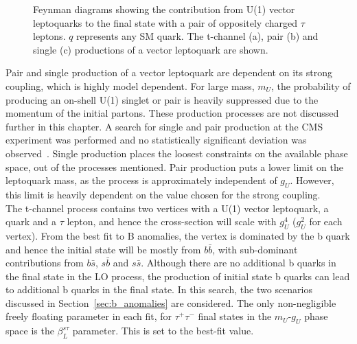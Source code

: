 \begin{figure}[t]
\begin{subfigure}[b]{0.3\textwidth}
\caption{}
\end{subfigure}
\vspace*{10mm}
\caption{Feynman diagrams showing the contribution from U(1) vector leptoquarks to the final state with a pair of oppositely charged $\tau$ leptons. $q$ represents any SM quark. The t-channel (a), pair (b) and single (c) productions of a vector leptoquark are shown.}
\label{fig:leptoquark_feynman}
\end{figure}

Pair and single production of a vector leptoquark are dependent on its strong coupling, which is highly model dependent.
For large mass, $m_U$, the probability of producing an on-shell U(1) singlet or pair is heavily suppressed due to the momentum of the initial partons.
These production processes are not discussed further in this chapter.
A search for single and pair production at the \ac{CMS} experiment was performed and no statistically significant deviation was observed~\cite{CMS:2022zks}.
Single production places the loosest constraints on the available phase space, out of the processes mentioned.
Pair production puts a lower limit on the leptoquark mass, as the process is approximately independent of $g_U$. 
However, this limit is heavily dependent on the value chosen for the strong coupling. \\

The t-channel process contains two vertices with a U(1) vector leptoquark, a quark and a $\tau$ lepton, and hence the cross-section will scale with $g_{U}^4$ ($g_{U}^2$ for each vertex).
From the best fit to B anomalies, the vertex is dominated by the b quark and hence the initial state will be mostly from $b\bar{b}$, with sub-dominant contributions from $b\bar{s}$, $s\bar{b}$ and $s\bar{s}$.
Although there are no additional b quarks in the final state in the \ac{LO} process, the production of initial state b quarks can lead to additional b quarks in the final state.
In this search, the two scenarios discussed in Section~\ref{sec:b_anomalies} are considered.
The only non-negligible freely floating parameter in each fit, for $\tau^{+}\tau^{-}$ final states in the $m_{U}$-$g_{U}$ phase space is the $\beta_{L}^{s\tau}$ parameter.
This is set to the best-fit value. \\

